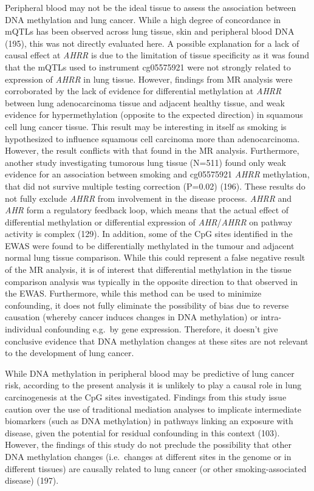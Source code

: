 \documentclass[11pt,oneside]{bristolthesis}
\begin{document}
Peripheral blood may not be the ideal tissue to assess the association between DNA methylation and lung cancer. While a high degree of concordance in mQTLs has been observed across lung tissue, skin and peripheral blood DNA (195), this was not directly evaluated here. A possible explanation for a lack of causal effect at \emph{AHRR} is due to the limitation of tissue specificity as it was found that the mQTLs used to instrument cg05575921 were not strongly related to expression of \emph{AHRR} in lung tissue. However, findings from MR analysis were corroborated by the lack of evidence for differential methylation at \emph{AHRR} between lung adenocarcinoma tissue and adjacent healthy tissue, and weak evidence for hypermethylation (opposite to the expected direction) in squamous cell lung cancer tissue. This result may be interesting in itself as smoking is hypothesized to influence squamous cell carcinoma more than adenocarcinoma. However, the result conflicts with that found in the MR analysis. Furthermore, another study investigating tumorous lung tissue (N=511) found only weak evidence for an association between smoking and cg05575921 \emph{AHRR} methylation, that did not survive multiple testing correction (P=0.02) (196). These results do not fully exclude \emph{AHRR} from involvement in the disease process. \emph{AHRR} and \emph{AHR} form a regulatory feedback loop, which means that the actual effect of differential methylation or differential expression of \emph{AHR}/\emph{AHRR} on pathway activity is complex (129). In addition, some of the CpG sites identified in the EWAS were found to be differentially methylated in the tumour and adjacent normal lung tissue comparison. While this could represent a false negative result of the MR analysis, it is of interest that differential methylation in the tissue comparison analysis was typically in the opposite direction to that observed in the EWAS. Furthermore, while this method can be used to minimize confounding, it does not fully eliminate the possibility of bias due to reverse causation (whereby cancer induces changes in DNA methylation) or intra-individual confounding e.g.~by gene expression. Therefore, it doesn't give conclusive evidence that DNA methylation changes at these sites are not relevant to the development of lung cancer.

While DNA methylation in peripheral blood may be predictive of lung cancer risk, according to the present analysis it is unlikely to play a causal role in lung carcinogenesis at the CpG sites investigated. Findings from this study issue caution over the use of traditional mediation analyses to implicate intermediate biomarkers (such as DNA methylation) in pathways linking an exposure with disease, given the potential for residual confounding in this context (103). However, the findings of this study do not preclude the possibility that other DNA methylation changes (i.e.~changes at different sites in the genome or in different tissues) are causally related to lung cancer (or other smoking-associated disease) (197).
\end{document}
